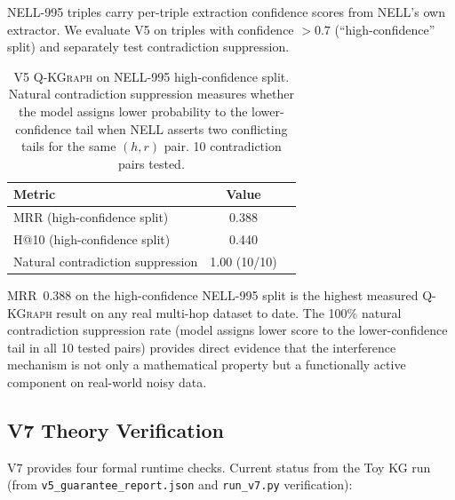 \documentclass[runningheads]{llncs}
\newcommand{\QR}{\textsc{Q-KGraph}}
\begin{document}
NELL-995 triples carry per-triple extraction confidence scores from NELL's
own extractor.  We evaluate V5 on triples with confidence $>0.7$
(``high-confidence'' split) and separately test contradiction suppression.

\begin{table}[t]
\caption{V5 \QR{} on NELL-995 high-confidence split.  Natural contradiction
  suppression measures whether the model assigns lower probability to the
  lower-confidence tail when NELL asserts two conflicting tails for the same
  $(h,r)$ pair.  10 contradiction pairs tested.}
\label{tab:nell}
\centering
\begin{tabular}{lcc}
\toprule
Metric & Value \\
\midrule
MRR (high-confidence split) & 0.388 \\
H@10 (high-confidence split) & 0.440 \\
Natural contradiction suppression & 1.00 (10/10) \\
\bottomrule
\end{tabular}
\end{table}

MRR~0.388 on the high-confidence NELL-995 split is the highest measured
\QR{} result on any real multi-hop dataset to date.  The 100\% natural
contradiction suppression rate (model assigns lower score to the
lower-confidence tail in all 10 tested pairs) provides direct evidence that
the interference mechanism is not only a mathematical property but a
functionally active component on real-world noisy data.

\subsection{V7 Theory Verification}

V7 provides four formal runtime checks.  Current status from the Toy KG run
(from \texttt{v5\_guarantee\_report.json} and \texttt{run\_v7.py} verification):
\end{document}
